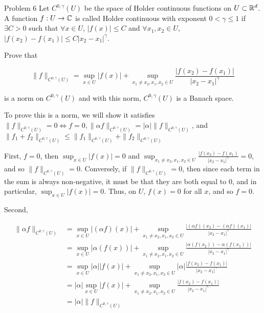 \documentclass{hmwk}
\begin{document}
\begin{problem}{Problem 6}
Let $C^{0, \gamma}(U)$ be the space of Holder continuous functions on $U \subset \mathbb{R}^d$. A function $f: U \rightarrow \mathbb{C}$ is called Holder continuous with exponent $0 < \gamma \leq 1$ if $\exists C > 0$ such that $\forall x \in U$, $|f(x)| \leq C$ and $\forall x_1, x_2 \in U$, $|f(x_2) - f(x_1)| \leq C|x_2 - x_1|^\gamma$. 

\pre Prove that 

$$\|f\|_{C^{0, \gamma}(U)} = \sup_{x \in U}|f(x)| + \sup_{x_1 \neq x_2, x_1, x_2 \in U} \frac{|f(x_2) - f(x_1)|}{|x_2 - x_1|^\gamma}$$

\pre is a norm on $C^{0, \gamma}(U)$ and with this norm, $C^{0, \gamma}(U)$ is a Banach space.
\end{problem}

\begin{solution}

\pre To prove this is a norm, we will show it satisfies $\|f\|_{C^{0, \gamma}(U)} = 0 \Leftrightarrow f = 0, \|\alpha f\|_{C^{0, \gamma}(U)} = |\alpha|\|f\|_{C^{0, \gamma}(U)}$, and $\|f_1 + f_2\|_{C^{0, \gamma}(U)} \leq \|f_1\|_{C^{0, \gamma}(U)} + \|f_2\|_{C^{0, \gamma}(U)}$ 

\pre First, $f = 0$, then $\sup_{x \in U} |f(x)| = 0$ and $\sup_{x_1 \neq x_2, x_1, x_2 \in U}\frac{|f(x_2) - f(x_1)}{|x_2 - x_1|^\gamma} = 0$, and so $\|f\|_{C^{0, \gamma}(U)} = 0$. Conversely, if $\|f\|_{C^{0, \gamma}(U)} = 0$, then since each term in the sum is always non-negative, it must be that they are both equal to 0, and in particular, $\sup_{x \in U} |f(x)| = 0$. Thus, on $U$, $f(x) = 0$ for all $x$, and so $f = 0$. 

\pre Second, 

\begin{align*}
    \|\alpha f\|_{C^{0, \gamma}(U)} &= \sup_{x \in U}|(\alpha f)(x)| + \sup_{x_1 \neq x_2, x_1, x_2 \in U}\frac{|(\alpha f)(x_2) - (\alpha f)(x_1)|}{|x_2 - x_1|^\gamma} \\
    &= \sup_{x \in U}|\alpha (f(x))| + \sup_{x_1 \neq x_2, x_1, x_2 \in U}\frac{|\alpha (f(x_2)) - \alpha (f(x_1))|}{|x_2 - x_1|^\gamma} \\
    &= \sup_{x \in U}|\alpha||f(x)| + \sup_{x_1 \neq x_2, x_1, x_2 \in U}|\alpha|\frac{|f(x_2) - f(x_1)|}{|x_2 - x_1|^\gamma} \\
    &= |\alpha| \sup_{x \in U}|f(x)| + \sup_{x_1 \neq x_2, x_1, x_2 \in U}\frac{|f(x_2) - f(x_1)|}{|x_2 - x_1|^\gamma} \\
    &= |\alpha|\|f\|_{C^{0, \gamma}(U)}
\end{align*}


\end{solution}
\end{document}
